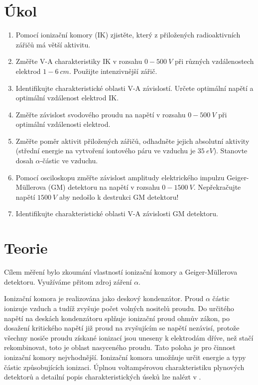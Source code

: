 \documentclass{protokol}
\begin{document}
  \section*{Úkol}
    \small
    \begin{enumerate}
      \item Pomocí ionizační komory (IK) zjistěte, který z přiložených radioaktivních zářičů má větší aktivitu.
      \item Změřte V-A charakteristiky IK v rozsahu $0-\SI{500}{V}$ při různých vzdálenostech elektrod $1-\SI{6}{cm}$. Použijte intenzivnější zářič.
      \item Identifikujte charakteristické oblasti V-A závislostí. Určete optimální napětí a optimální vzdálenost elektrod IK.
      \item Změřte závislost svodového proudu na napětí v rozsahu $0-\SI{500}{V}$ při optimální vzdálenos\-ti elektrod.
      \item Změřte poměr aktivit přiložených zářičů, odhadněte jejich absolutní aktivity (střední energie na vytvoření iontového páru ve vzduchu je $\SI{35}{eV}$). Stanovte dosah $\alpha$-částic ve vzduchu.
      \item Pomocí osciloskopu změřte závislost amplitudy elektrického impulzu Geiger-Müllerova (GM) detektoru na napětí v rozsahu $0-\SI{1500}{V}$. Nepřekračujte napětí $\SI{1500}{V}$ aby nedošlo k destrukci GM detektoru!
      \item Identifikujte charakteristické oblasti V-A závislosti GM detektoru.
    \end{enumerate}
    \normalsize
  \section*{Teorie} 
    \small
    Cílem měření bylo zkoumání vlastností ionizační komory a Geiger-Müllerova detektoru. Využí\-váme přitom zdroj záření $\alpha$. 

    Ionizační komora je realizována jako deskový kondenzátor. Proud $\alpha$ částic ionizuje vzduch a tudíž zvyšuje počet volných nositelů proudu. Do určitého napětí na deskách kondenzátoru splňuje ionizační proud ohmův zákon, po dosažení kritického napětí již proud na zvyšujícím se napětí nezávisí, protože všechny nosiče proudu získané ionizací jsou uneseny k elektrodám dříve, než stačí rekombinovat, toto je oblast nasyceného proudu. Tato poloha je pro činnost ionizační komory nejvhodnější. Ionizační komora umožňuje určit energie a typy částic způsobu\-jících ionizaci. Úplnou voltampérovou charakteristiku plynových detektorů a detailní popis charakteristických úseků lze nalézt v \cite{pokyny}.
\end{document}
